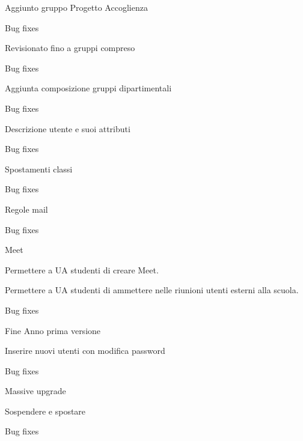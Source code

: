 \begin{changelog}[author=JOHN DOE, sectioncmd=\chapter*]
		\begin{version}[v=1.9.9.1,
		date=2023-09-07]
		\added
		\item Aggiunto gruppo Progetto Accoglienza
		\fixed
		\item Bug fixes
	\end{version}
	\begin{version}[v=1.9.9,
		date=2023-08-25]
		\added
		\item Revisionato fino a gruppi compreso
		\fixed
		\item Bug fixes
	\end{version}
	\begin{version}[v=1.0.6,
		date=2023-08-14]
		\added
		\item Aggiunta composizione gruppi dipartimentali
		\fixed
		\item Bug fixes
	\end{version}
	\begin{version}[v=1.0.5,
		date=2023-08-11]
		\added
		\item Descrizione utente e suoi attributi
		\fixed
		\item Bug fixes
	\end{version}
	\begin{version}[v=1.0.4,
		date=2023-07-25]
		\added
		\item Spostamenti classi
		\fixed
		\item Bug fixes
	\end{version}
	\begin{version}[v=1.0.3,
		date=2023-07-25]
		\added
		\item Regole mail
		\fixed
		\item Bug fixes
	\end{version}
		\begin{version}[v=1.0.2,
		date=2023-07-21]
		\added
		\item Meet
		\item Permettere a  UA studenti di creare Meet.
		\item Permettere a UA studenti di ammettere nelle riunioni utenti esterni alla scuola.
		\fixed
		\item Bug fixes
	\end{version}
	\begin{version}[v=1.0.1,
		date=2023-07-17]
		\added
		\item Fine Anno prima versione
		\item Inserire nuovi utenti con modifica password
		\fixed
		\item Bug fixes
	\end{version}
	\begin{version}[v=1.0.0,
		date=2023-07-15]
		\added
		\item Massive upgrade
		\item Sospendere e spostare
		\fixed
		\item Bug fixes
	\end{version}
	\end{changelog}
	\listoftodos